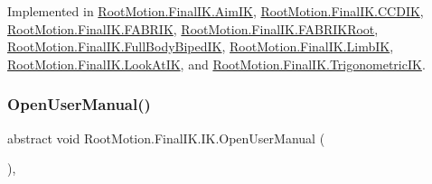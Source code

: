 Implemented in \mbox{\hyperlink{class_root_motion_1_1_final_i_k_1_1_aim_i_k_a0e574684809fdcb9dcd2a972ecc94871}{Root\+Motion.\+Final\+I\+K.\+Aim\+IK}}, \mbox{\hyperlink{class_root_motion_1_1_final_i_k_1_1_c_c_d_i_k_adf8dc52ac72a005efbc193fe59154b06}{Root\+Motion.\+Final\+I\+K.\+C\+C\+D\+IK}}, \mbox{\hyperlink{class_root_motion_1_1_final_i_k_1_1_f_a_b_r_i_k_aac64228ef162eaa3e39a159400e7f6d4}{Root\+Motion.\+Final\+I\+K.\+F\+A\+B\+R\+IK}}, \mbox{\hyperlink{class_root_motion_1_1_final_i_k_1_1_f_a_b_r_i_k_root_a7d313fec290479a2b5bcec328d63fd09}{Root\+Motion.\+Final\+I\+K.\+F\+A\+B\+R\+I\+K\+Root}}, \mbox{\hyperlink{class_root_motion_1_1_final_i_k_1_1_full_body_biped_i_k_aae4e2635775efc0a5f2b1058b7e693fe}{Root\+Motion.\+Final\+I\+K.\+Full\+Body\+Biped\+IK}}, \mbox{\hyperlink{class_root_motion_1_1_final_i_k_1_1_limb_i_k_a06dda0b6311aed7d024f2a286eb77c6c}{Root\+Motion.\+Final\+I\+K.\+Limb\+IK}}, \mbox{\hyperlink{class_root_motion_1_1_final_i_k_1_1_look_at_i_k_a1bab9ccb38d81344fe51e00639efaac1}{Root\+Motion.\+Final\+I\+K.\+Look\+At\+IK}}, and \mbox{\hyperlink{class_root_motion_1_1_final_i_k_1_1_trigonometric_i_k_a11ec745bda457587c622e4c9ccd499bc}{Root\+Motion.\+Final\+I\+K.\+Trigonometric\+IK}}.

\mbox{\label{class_root_motion_1_1_final_i_k_1_1_i_k_a1922e31d550e27dcc60eca0d62c699c5}} 
\subsubsection{\texorpdfstring{Open\+User\+Manual()}{OpenUserManual()}}
{\footnotesize\ttfamily abstract void Root\+Motion.\+Final\+I\+K.\+I\+K.\+Open\+User\+Manual (\begin{DoxyParamCaption}{ }\end{DoxyParamCaption})\hspace{0.3cm}{\ttfamily [protected]}, {}}



